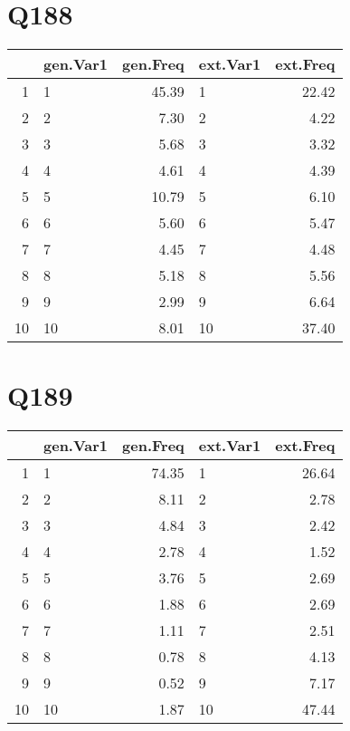 \documentclass{amsart}
\begin{document}
\section{Q188}
\begin{table}[ht]
\centering
\begin{tabular}{rlrlr}
  \hline
 & gen.Var1 & gen.Freq & ext.Var1 & ext.Freq \\ 
  \hline
1 & 1 & 45.39 & 1 & 22.42 \\ 
  2 & 2 & 7.30 & 2 & 4.22 \\ 
  3 & 3 & 5.68 & 3 & 3.32 \\ 
  4 & 4 & 4.61 & 4 & 4.39 \\ 
  5 & 5 & 10.79 & 5 & 6.10 \\ 
  6 & 6 & 5.60 & 6 & 5.47 \\ 
  7 & 7 & 4.45 & 7 & 4.48 \\ 
  8 & 8 & 5.18 & 8 & 5.56 \\ 
  9 & 9 & 2.99 & 9 & 6.64 \\ 
  10 & 10 & 8.01 & 10 & 37.40 \\ 
   \hline
\end{tabular}
\end{table}

\section{Q189}
\begin{table}[ht]
\centering
\begin{tabular}{rlrlr}
  \hline
 & gen.Var1 & gen.Freq & ext.Var1 & ext.Freq \\ 
  \hline
1 & 1 & 74.35 & 1 & 26.64 \\ 
  2 & 2 & 8.11 & 2 & 2.78 \\ 
  3 & 3 & 4.84 & 3 & 2.42 \\ 
  4 & 4 & 2.78 & 4 & 1.52 \\ 
  5 & 5 & 3.76 & 5 & 2.69 \\ 
  6 & 6 & 1.88 & 6 & 2.69 \\ 
  7 & 7 & 1.11 & 7 & 2.51 \\ 
  8 & 8 & 0.78 & 8 & 4.13 \\ 
  9 & 9 & 0.52 & 9 & 7.17 \\ 
  10 & 10 & 1.87 & 10 & 47.44 \\ 
   \hline
\end{tabular}
\end{table}
\end{document}
